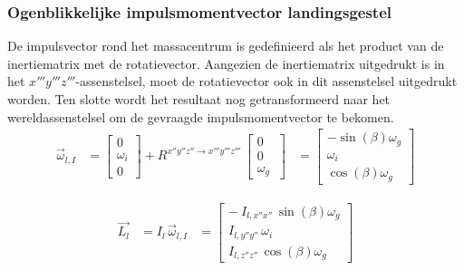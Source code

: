 \subsubsection{Ogenblikkelijke impulsmomentvector landingsgestel}
De impulsvector rond het massacentrum is gedefinieerd als het product van de inertiematrix met de rotatievector. Aangezien de inertiematrix uitgedrukt is in het $x'''y'''z'''$-assenstelsel, moet de rotatievector ook in dit assenstelsel uitgedrukt worden. 
Ten slotte wordt het resultaat nog getransformeerd naar het wereldassenstelsel om de gevraagde impulsmomentvector te bekomen.
\begin{equation*}
\begin{split}
\overrightarrow{\omega}_{l,I}
&=\begin{bmatrix}
0\\
\omega_{i}\\
0\
\end{bmatrix}
+R^{x''y''z'' \rightarrow x'''y'''z'''}\,
\begin{bmatrix}
0\\
0\\
\omega_{g}\
\end{bmatrix}
&=\begin{bmatrix}
-\sin \left( \beta \right) \omega_{g}
\\
\omega_{i}\\
\cos \left( \beta
 \right) \omega_{g}\
\end{bmatrix}
\end{split}
\end{equation*}

\begin{equation}
\begin{split}
\overrightarrow{L_{l}}&=I_{l}\,\overrightarrow{\omega}_{l,I}&=
\begin{bmatrix}
-{\ I_{l,x''x''}}\,\sin \left( \beta \right) 
\omega_{g}\\
{ I_{l,y''y''}}\,\omega_{i}
\\
{I_{l,z''z''}}\,\cos \left( \beta \right) \omega_
{g}\
\end{bmatrix}
\end{split}
\end{equation}

